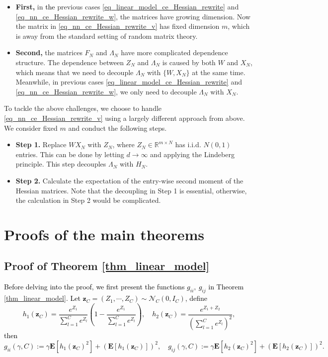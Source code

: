 \documentclass{article}
\newcommand{\R}{\mathbb{R}}
\newcommand{\E}{\mathbf{E}}
\newcommand\mf{\mathbf}
\newcommand\ml{\mathcal}
\newcommand{\1}{^{(1)}}
\newcommand{\2}{^{(2)}}
\renewcommand{\l}{\left}
\renewcommand{\r}{\right}
\newcommand{\zhaoruirevise}[1]{\textcolor{black}{ #1}}
\begin{document}
\begin{itemize}
[topsep=1pt,parsep=1pt,partopsep=1pt, leftmargin=*]
\item {\bf First,} in \zhaoruirevise{the}  previous cases 
\eqref{eq_linear_model_ce_Hessian_rewrite} and \eqref{eq_nn_ce_Hessian_rewrite_w}, the matrices have growing dimension. Now the matrix in \eqref{eq_nn_ce_Hessian_rewrite_v} has fixed dimension $m$, which is away from the standard setting of random matrix theory.
\item {\bf Second,} the matrices $F_N$ and $\Lambda_N$ have more complicated dependence structure. The dependence between $Z_N$ and $\Lambda_N$ is caused by both $W$ and $X_N$, which means that we need to decouple $\Lambda_N$ with $\{W,X_N\}$ at the same time. Meanwhile, in  previous cases 
\eqref{eq_linear_model_ce_Hessian_rewrite} and \eqref{eq_nn_ce_Hessian_rewrite_w}, we only need to decouple $\Lambda_N$ with $X_N$.
\end{itemize}


To tackle the above challenges, we choose to handle \eqref{eq_nn_ce_Hessian_rewrite_v} using a largely different approach from above. We consider fixed $m$ and conduct the following steps.

\begin{itemize}
[topsep=1pt,parsep=1pt,partopsep=1pt, leftmargin=*]
\item {\bf Step 1.} Replace $WX_N$ with $Z_N$, where $Z_N\in \R^{m\times N}$ has i.i.d. $N(0,1)$ entries. This can be done by letting $d\rightarrow \infty$ and applying the Lindeberg principle. This step decouples $\Lambda_N$ with $H_N$.  

\item {\bf Step 2.} Calculate the expectation of the entry-wise second moment of the Hessian matrices. Note that the decoupling in Step 1 is essential, otherwise, the calculation in Step 2 would be complicated.  
\end{itemize}

\section{Proofs of the main theorems}


\subsection{Proof of Theorem \ref{thm_linear_model}}
\label{appendix_thm1}

\zhaoruirevise{Before delving into the proof, we first present the functions $g_{ii},\ g_{ij}$ in Theorem \ref{thm_linear_model}. Let $\mf{z}_C=(Z_1,\cdots,Z_C)\sim \ml{N}_C(0,I_C)$, define$$h_1(\mf{z}_C)=\frac{e^{Z_1}}{\sum_{l=1}^Ce^{Z_l}}\l(1-\frac{e^{Z_1}}{\sum_{l=1}^Ce^{Z_l}}\r),\quad h_2(\mf{z}_C)=\frac{e^{Z_1+Z_2}}{\l(\sum_{l=1}^Ce^{Z_l}\r)^2}, $$
then $$g_{ii}(\gamma,C):=\gamma\E[h_1(\mf{z}_C)^2]+(\E[h_1(\mf{z}_C)])^2,\quad g_{ij}(\gamma,C):=\gamma\E[h_2(\mf{z}_C)^2]+(\E[h_2(\mf{z}_C)])^2.$$}
\end{document}
